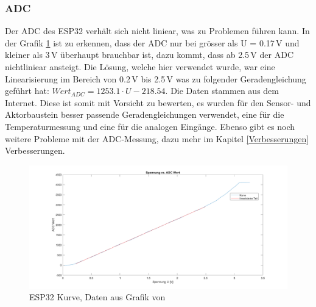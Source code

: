 \subsubsection{ADC}
Der ADC des ESP32 verhält sich nicht liniear, was zu Problemen führen kann. In der Grafik \ref{pic: ESP32_Kurve} ist zu erkennen, dass der ADC nur bei grösser als U = 0.17\,V und kleiner als 3\,V überhaupt brauchbar ist, dazu kommt, dass ab 2.5\,V der ADC nichtliniear ansteigt. Die Lösung, welche hier verwendet wurde, war eine Linearisierung im Bereich von  0.2\,V bis 2.5\,V was zu folgender Geradengleichung geführt hat: $Wert_{ADC} = 1253.1\cdot U - 218.54$. Die Daten stammen aus dem Internet. Diese ist somit mit Vorsicht zu bewerten, es wurden für den Sensor- und Aktorbaustein besser passende Geradengleichungen verwendet, eine für die Temperaturmessung und eine für die analogen Eingänge. Ebenso gibt es noch weitere Probleme mit der ADC-Messung, dazu mehr im Kapitel \ref{Verbesserungen} Verbesserungen.
\begin{figure}[h!]
	\centering
	\includegraphics[width=\textwidth]{graphics/ESP32_Kurve.png}
	\caption{ESP32 Kurve, Daten aus Grafik von \cite{randomnerdtutorials_esp32_2019}}
	\label{pic: ESP32_Kurve}
\end{figure}

